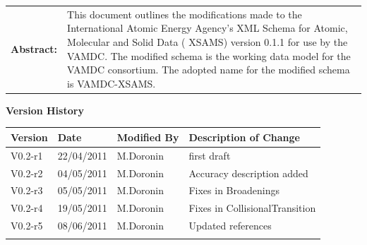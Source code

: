 {\begin{titlepage}
\noindent \begin{tabular}{p{1.7in}p{4.3in}}

\textbf{Abstract:} & 
This document outlines the modifications made to the International Atomic
Energy Agency's XML Schema for Atomic, Molecular and Solid Data ( XSAMS)
version 0.1.1 for use by the VAMDC.  The modified schema is the working
data model for the VAMDC consortium.  The adopted name for the modified
schema is VAMDC-XSAMS.  
\end{tabular}



\end{titlepage}

\noindent \large \textbf{Version History}\normalsize

\noindent \begin{tabular}{|l|l|l|l|} 
\hline 
\textbf{Version} & \textbf{Date} & \textbf{Modified By} & \textbf{Description of Change} \\ \hline 
V0.2-r1 & 22/04/2011 & M.Doronin & first draft \\ \hline 
V0.2-r2 & 04/05/2011 & M.Doronin & Accuracy description added \\ \hline 
V0.2-r3 & 05/05/2011 & M.Doronin & Fixes in Broadenings \\ \hline
V0.2-r4 & 19/05/2011 & M.Doronin & Fixes in CollisionalTransition \\ \hline
V0.2-r5 & 08/06/2011 & M.Doronin & Updated references \\ \hline
 &  &  &  \\ \hline 
\end{tabular}



}
